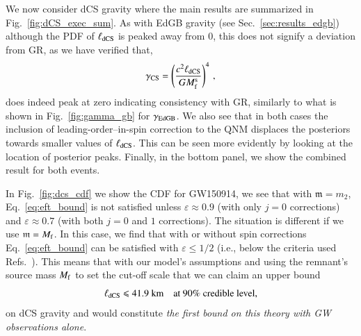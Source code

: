 \documentclass[twocolumn,
               prd,
               aps,
               superscriptaddress,
               tightenlines,
               nofootinbib,
               eqsecnum,
               amsfonts,
               amsmath,
               longbibliography]{revtex4-1}
\newcommand{\gm}{\mathfrak{m}}
\newcommand{\agcomm}[1]{{\textcolor{red}{{[AG: #1]}}}}
\begin{document}
We now consider dCS gravity where the main results are summarized in Fig.~\ref{fig:dCS_exec_sum}.
%
As with EdGB gravity (see Sec.~\ref{sec:results_edgb}) although the PDF of $\ell_{\rm dCS}$
is peaked away from 0, this does not signify a deviation from GR, as we have verified that,
%
\begin{equation}
    \gamma_{\rm CS} = \left( \frac{c^2 \ell_{\rm dCS}}{G M^{\rm s}_{\rm f}} \right)^{4}\,,
\end{equation}
%
does indeed peak at zero indicating consistency with GR, similarly to what is
shown in Fig.~\ref{fig:gamma_gb} for $\gamma_{\rm EdGB}$.
%
We also see that in both cases the inclusion of leading-order--in-spin
correction to the QNM displaces the posteriors towards smaller values of
$\ell_{\rm dCS}$. This can be seen more evidently by looking at the location of
posterior peaks.
%
Finally, in the bottom panel, we show the combined result for both events.

In Fig.~\ref{fig:dcs_cdf} we show the CDF for GW150914, we see that with $\gm = m_2$,
Eq.~\eqref{eq:eft_bound} is not satisfied unless $\varepsilon \approx 0.9$ (with only $j=0$ corrections) and
$\varepsilon \approx 0.7$ (with both $j=0$ and $1$ corrections).
%
The situation is different if we use $\gm = M_{\rm f}$. In this case, we find that
with or without spin corrections Eq.~\eqref{eq:eft_bound} can be satisfied
with $\varepsilon \leqslant 1/2$ (i.e., below the criteria used
Refs.~\cite{Nair:2019iur,Perkins:2021mhb,Lyu:2022gdr}).
%
This means that with our model's assumptions and using the remnant's source mass $M_{\rm f}$ to set the
cut-off scale that we can claim an upper bound
%
\begin{equation}
\ell_{\rm dCS} \leqslant 41.9~\textrm{km}
\quad \textrm{at 90\% credible level},
\end{equation}
%
on dCS gravity and would constitute \emph{the first bound on this theory with GW
observations alone}.
%
\end{document}
